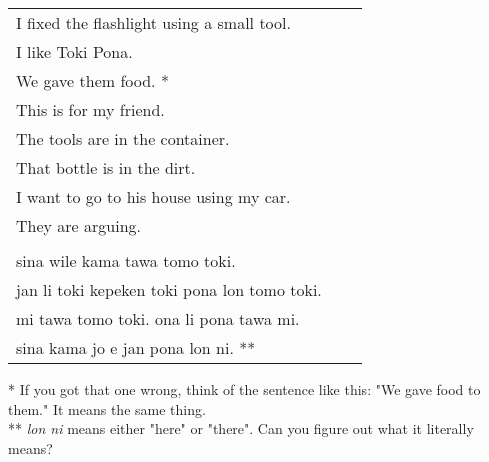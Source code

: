 \begin{supertabular}{p{5,5cm}|ll}
I fixed the flashlight using a small tool.  &&  \\ %
I like Toki Pona.   &&   \\ %
We gave them food. * &&    \\ %
This is for my friend.   &&   \\ %
The tools are in the container.   &&   \\ %
That bottle is in the dirt.  &&    \\ %
I want to go to his house using my car.  &&   \\  %
They are arguing.   &&   \\ %
&& \\ %
sina wile kama tawa tomo toki.   &&   \\ %
jan li toki kepeken toki pona lon tomo toki.  &&    \\ %
mi tawa tomo toki. ona li pona tawa mi.  &&   \\  %
sina kama jo e jan pona lon ni. **  &&   \\ %
\end{supertabular} 

* If you got that one wrong, think of the sentence like this: 
"We gave food to them." It means the same thing. \\
** \textit{lon ni} means either "here" or "there". 
Can you figure out what it literally means? 
%
